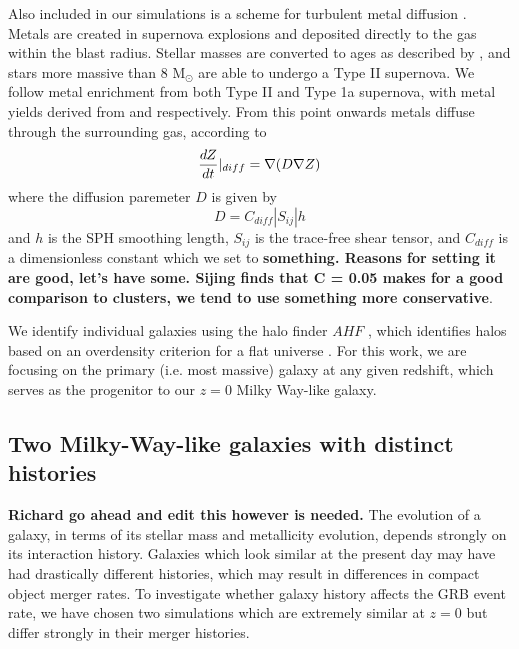 \documentclass[nofootinbib,twocolumn,prd]{emulateapj}
\begin{document}
Also included in our simulations is a scheme for turbulent metal
diffusion \citep{Shen10}.  Metals are created in supernova explosions
and deposited directly to the gas within the blast radius.  Stellar
masses are converted to ages as described by \citet{Raiteri96}, and
stars more massive than 8 M$_\odot$ are able to undergo a Type II
supernova.  We follow metal enrichment from both Type II and Type 1a
supernova, with metal yields derived from \citet{Weaver93} and
\citet{Thielemann86} respectively.  From this point onwards metals
diffuse through the surrounding gas, according to 
\begin{equation}
\frac{dZ}{dt}|_{diff} = \nabla (D \nabla {Z}) \\
\end{equation}
%
where the diffusion paremeter $D$ is given by
%
\begin{equation}
D = C_{diff} |S_{ij}| h
\end{equation}
%
and $h$ is the SPH smoothing length, $S_{ij}$ is the trace-free shear
tensor, and $C_{diff}$ is a dimensionless constant which we set to
{\bf something.  Reasons for setting it are good, let's have some.
Sijing finds that C = 0.05 makes for a good comparison to clusters, we
tend to use something more conservative}.

We identify individual galaxies using the halo finder $AHF$
\citep{Gill04,Knollmann09}, which identifies halos based on an
overdensity criterion for a flat universe \citep{Gross97}.  For this
work, we are focusing on the primary (i.e. most massive) galaxy at any
given redshift, which serves as the progenitor to our $z = 0$ Milky
Way-like galaxy.



\subsection{Two Milky-Way-like galaxies with distinct histories }

{\bf Richard go ahead and edit this however is needed.}  The evolution
of a galaxy, in terms of its stellar mass and metallicity evolution,
depends strongly on its interaction history.  Galaxies which look
similar at the present day may have had drastically different
histories, which may result in differences in compact object merger
rates.  To investigate whether galaxy history affects the GRB event
rate, we have chosen two simulations which are extremely similar at $z
= 0$ but differ strongly in their merger histories.
\end{document}
